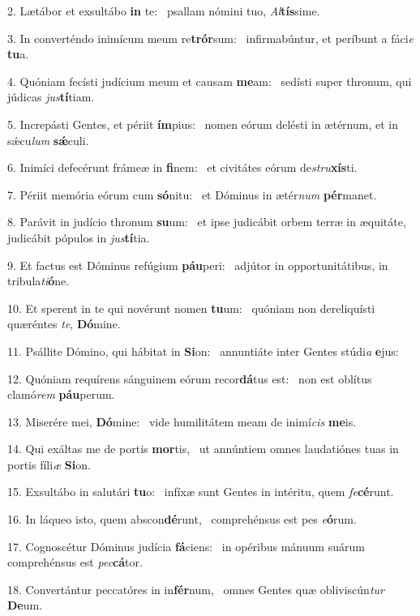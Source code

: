 2. Lætábor et exsultábo \textbf{in} te: \ast\  psallam nómini tuo, \textit{Al}\textbf{tís}sime.\

3. In converténdo inimícum meum re\textbf{trór}sum: \ast\  infirmabúntur, et períbunt a fáci\textit{e} \textbf{tu}a.\

4. Quóniam fecísti judícium meum et causam \textbf{me}am: \ast\  sedísti super thronum, qui júdicas \textit{jus}\textbf{tí}tiam.\

5. Increpásti Gentes, et périit \textbf{ím}pius: \ast\  nomen eórum delésti in ætérnum, et in sǽcu\textit{lum} \textbf{sǽ}culi.\

6. Inimíci defecérunt frámeæ in \textbf{fi}nem: \ast\  et civitátes eórum de\textit{stru}\textbf{xís}ti.\

7. Périit memória eórum cum \textbf{só}nitu: \ast\  et Dóminus in ætér\textit{num} \textbf{pér}manet.\

8. Parávit in judício thronum \textbf{su}um: \ast\  et ipse judicábit orbem terræ in æquitáte, judicábit pópulos in \textit{jus}\textbf{tí}tia.\

9. Et factus est Dóminus refúgium \textbf{páu}peri: \ast\  adjútor in opportunitátibus, in tribula\textit{ti}\textbf{ó}ne.\

10. Et sperent in te qui novérunt nomen \textbf{tu}um: \ast\  quóniam non dereliquísti quæréntes \textit{te}, \textbf{Dó}mine.\

11. Psállite Dómino, qui hábitat in \textbf{Si}on: \ast\  annuntiáte inter Gentes stúdi\textit{a} \textbf{e}jus:\

12. Quóniam requírens sánguinem eórum recor\textbf{dá}tus est: \ast\  non est oblítus clamó\textit{rem} \textbf{páu}perum.\

13. Miserére mei, \textbf{Dó}mine: \ast\  vide humilitátem meam de inimí\textit{cis} \textbf{me}is.\

14. Qui exáltas me de portis \textbf{mor}tis, \ast\  ut annúntiem omnes laudatiónes tuas in portis fíli\textit{æ} \textbf{Si}on.\

15. Exsultábo in salutári \textbf{tu}o: \ast\  infíxæ sunt Gentes in intéritu, quem \textit{fe}\textbf{cé}runt.\

16. In láqueo isto, quem abscon\textbf{dé}runt, \ast\  comprehénsus est pes \textit{e}\textbf{ó}rum.\

17. Cognoscétur Dóminus judícia \textbf{fá}ciens: \ast\  in opéribus mánuum suárum comprehénsus est \textit{pec}\textbf{cá}tor.\

18. Convertántur peccatóres in in\textbf{fér}num, \ast\  omnes Gentes quæ obliviscún\textit{tur} \textbf{De}um.\


